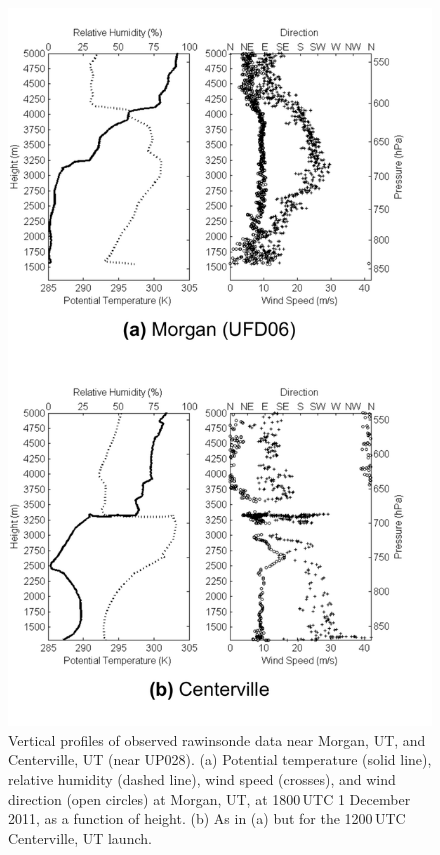\documentclass[pdftex,12pt]{article}
\begin{document}
\begin{figure}[t]
\centering
\includegraphics[width=27pc,angle=0]{sound_comp}
\caption{Vertical profiles of observed rawinsonde data near Morgan, UT, and Centerville, UT (near UP028). (a) Potential temperature (solid line), relative humidity (dashed line), wind speed (crosses), and wind direction (open circles) at Morgan, UT, at 1800\,UTC 1 December 2011, as a function of height. (b) As in (a) but for the 1200\,UTC Centerville, UT launch.}
\label{fig:sound}
\end{figure}
\end{document}
